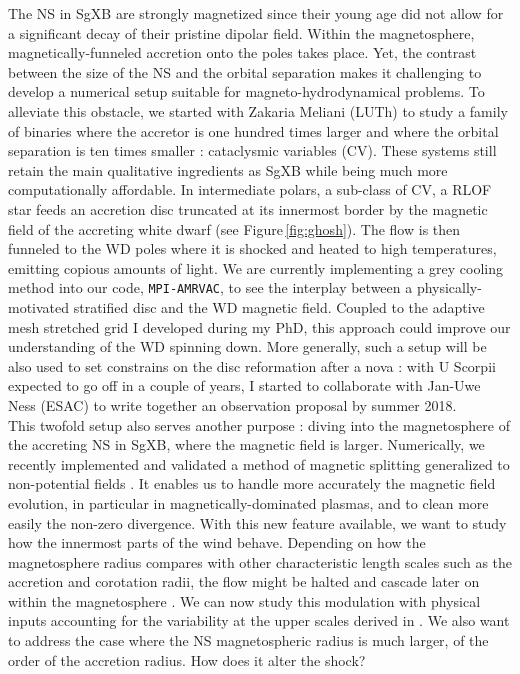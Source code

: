 \documentclass[a4paper,12pt,onecolumn]{article}
\newcommand{\sgx}{SgXB\xspace}
\begin{document}
The NS in \sgx are strongly magnetized since their young age did not allow for a significant decay of their pristine dipolar field. Within the magnetosphere, magnetically-funneled accretion onto the poles takes place. Yet, the contrast between the size of the NS and the orbital separation makes it challenging to develop a numerical setup suitable for magneto-hydrodynamical problems. To alleviate this obstacle, we started with Zakaria Meliani (LUTh) to study a family of binaries where the accretor is one hundred times larger and where the orbital separation is ten times smaller : cataclysmic variables (CV). These systems still retain the main qualitative ingredients as \sgx while being much more computationally affordable. In intermediate polars, a sub-class of CV, a RLOF star feeds an accretion disc truncated at its innermost border by the magnetic field of the accreting white dwarf (see Figure\,\ref{fig:ghosh}). The flow is then funneled to the WD poles where it is shocked and heated to high temperatures, emitting copious amounts of light. We are currently implementing a grey cooling method into our code, \texttt{MPI-AMRVAC}, to see the interplay between a physically-motivated stratified disc and the WD magnetic field. Coupled to the adaptive mesh stretched grid I developed during my PhD, this approach could improve our understanding of the WD spinning down. More generally, such a setup will be also used to set constrains on the disc reformation after a nova \citep{Ness2012} : with U Scorpii expected to go off in a couple of years, I started to collaborate with Jan-Uwe Ness (ESAC) to write together an observation proposal by summer 2018.\\
\indent This twofold setup also serves another purpose : diving into the magnetosphere of the accreting NS in \sgx, where the magnetic field is larger. Numerically, we recently implemented and validated a method of magnetic splitting generalized to non-potential fields \citep{Xia2017}. It enables us to handle more accurately the magnetic field evolution, in particular in magnetically-dominated plasmas, and to clean more easily the non-zero divergence. With this new feature available, we want to study how the innermost parts of the wind behave. Depending on how the magnetosphere radius compares with other characteristic length scales such as the accretion and corotation radii, the flow might be halted and cascade later on within the magnetosphere \citep{Bozzo2008}. We can now study this modulation with physical inputs accounting for the variability at the upper scales derived in \cite{ElMellah}. We also want to address the case where the NS magnetospheric radius is much larger, of the order of the accretion radius. How does it alter the shock? 
 	
\end{document}
